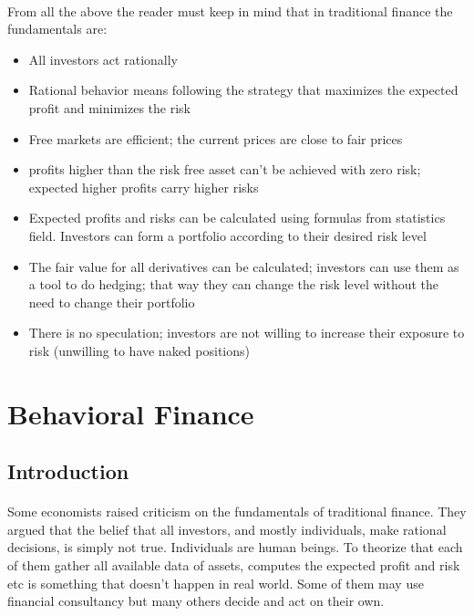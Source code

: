 \documentclass{article}
\begin{document}
\paragraph{ }
From all the above the reader must keep in mind that in traditional finance the fundamentals are:
\begin{itemize}
\item All investors act rationally
\item Rational behavior means following the strategy that maximizes the expected profit and minimizes the risk
\item Free markets are efficient; the current prices are close to fair prices
\item profits higher than the risk free asset can't be achieved with zero risk; expected higher profits carry higher risks
\item Expected profits and risks can be calculated using formulas from statistics field. Investors can form a portfolio according to their desired risk level
\item The fair value for all derivatives can be calculated; investors can use them as a tool to do hedging; that way they can change the risk level without the need to change their portfolio
\item There is no speculation; investors are not willing to increase their exposure to risk (unwilling to have naked positions)
\end{itemize}

\section{Behavioral Finance}
\subsection{Introduction}
\paragraph{ }
Some economists raised criticism on the fundamentals of traditional finance. They argued that the belief that all investors, and mostly individuals, make rational decisions, is simply not true. Individuals are human beings. To theorize that each of them gather all available data of assets, computes the expected profit and risk etc is something that doesn't happen in real world. Some of them may use financial consultancy but many others decide and act on their own.
\end{document}
